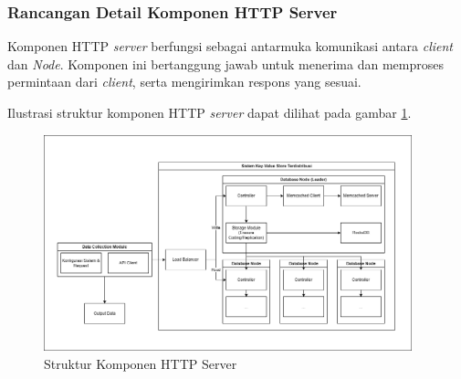 \subsubsection{Rancangan Detail Komponen HTTP Server}
\label{subsubsection:detail-komponen-HTTP-server}

Komponen HTTP \textit{server} berfungsi sebagai antarmuka komunikasi antara \textit{client} dan \textit{Node}. Komponen ini bertanggung jawab untuk menerima dan memproses permintaan dari \textit{client}, serta mengirimkan respons yang sesuai.

Ilustrasi struktur komponen HTTP \textit{server} dapat dilihat pada gambar \ref{fig:http-server-structure}.

\begin{figure}[ht]
    \centering
    \includegraphics[width=0.95\textwidth]{resources/chapter-3/general-architecture.png}
    \caption{Struktur Komponen HTTP Server}
    \label{fig:http-server-structure}
\end{figure}
